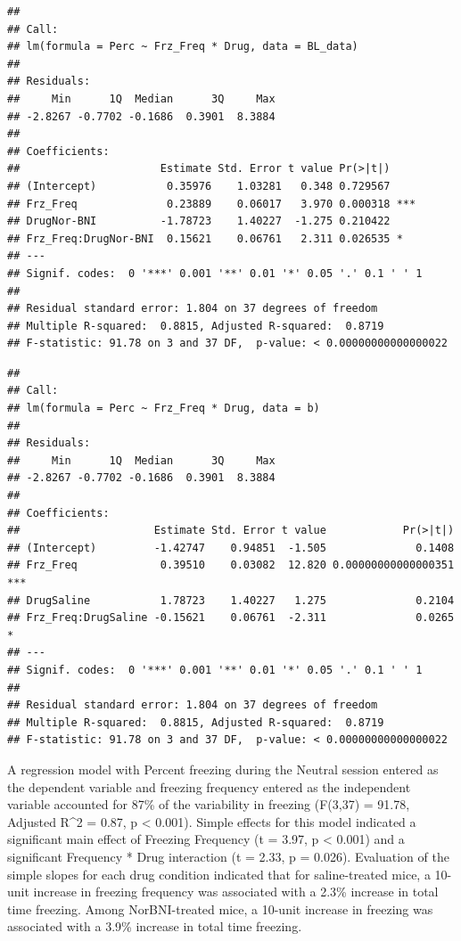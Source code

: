\documentclass[
]{book}
\begin{document}
\begin{verbatim}
## 
## Call:
## lm(formula = Perc ~ Frz_Freq * Drug, data = BL_data)
## 
## Residuals:
##     Min      1Q  Median      3Q     Max 
## -2.8267 -0.7702 -0.1686  0.3901  8.3884 
## 
## Coefficients:
##                      Estimate Std. Error t value Pr(>|t|)    
## (Intercept)           0.35976    1.03281   0.348 0.729567    
## Frz_Freq              0.23889    0.06017   3.970 0.000318 ***
## DrugNor-BNI          -1.78723    1.40227  -1.275 0.210422    
## Frz_Freq:DrugNor-BNI  0.15621    0.06761   2.311 0.026535 *  
## ---
## Signif. codes:  0 '***' 0.001 '**' 0.01 '*' 0.05 '.' 0.1 ' ' 1
## 
## Residual standard error: 1.804 on 37 degrees of freedom
## Multiple R-squared:  0.8815, Adjusted R-squared:  0.8719 
## F-statistic: 91.78 on 3 and 37 DF,  p-value: < 0.00000000000000022
\end{verbatim}

\begin{verbatim}
## 
## Call:
## lm(formula = Perc ~ Frz_Freq * Drug, data = b)
## 
## Residuals:
##     Min      1Q  Median      3Q     Max 
## -2.8267 -0.7702 -0.1686  0.3901  8.3884 
## 
## Coefficients:
##                     Estimate Std. Error t value            Pr(>|t|)    
## (Intercept)         -1.42747    0.94851  -1.505              0.1408    
## Frz_Freq             0.39510    0.03082  12.820 0.00000000000000351 ***
## DrugSaline           1.78723    1.40227   1.275              0.2104    
## Frz_Freq:DrugSaline -0.15621    0.06761  -2.311              0.0265 *  
## ---
## Signif. codes:  0 '***' 0.001 '**' 0.01 '*' 0.05 '.' 0.1 ' ' 1
## 
## Residual standard error: 1.804 on 37 degrees of freedom
## Multiple R-squared:  0.8815, Adjusted R-squared:  0.8719 
## F-statistic: 91.78 on 3 and 37 DF,  p-value: < 0.00000000000000022
\end{verbatim}

A regression model with Percent freezing during the Neutral session entered as the dependent variable and freezing frequency entered as the independent variable accounted for 87\% of the variability in freezing (F(3,37) = 91.78, Adjusted R\^{}2 = 0.87, p \textless{} 0.001). Simple effects for this model indicated a significant main effect of Freezing Frequency (t = 3.97, p \textless{} 0.001) and a significant Frequency * Drug interaction (t = 2.33, p = 0.026). Evaluation of the simple slopes for each drug condition indicated that for saline-treated mice, a 10-unit increase in freezing frequency was associated with a 2.3\% increase in total time freezing. Among NorBNI-treated mice, a 10-unit increase in freezing was associated with a 3.9\% increase in total time freezing.
\end{document}
